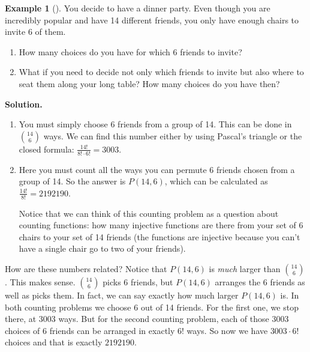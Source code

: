 \documentclass[12pt,]{book}
\theoremstyle{plain}
\theoremstyle{definition}
\theoremstyle{definition}
\newtheorem{example}[theorem]{Example}
\theoremstyle{definition}
\numberwithin{equation}{chapter}
\begin{document}
\begin{example}[]\label{example-46}
\hypertarget{p-951}{}%
You decide to have a dinner party. Even though you are incredibly popular and have 14 different friends, you only have enough chairs to invite 6 of them.%
\par
\hypertarget{p-952}{}%
\leavevmode%
\begin{enumerate}
\item\hypertarget{li-438}{}\hypertarget{p-953}{}%
How many choices do you have for which 6 friends to invite?%
\item\hypertarget{li-439}{}\hypertarget{p-954}{}%
What if you need to decide not only which friends to invite but also where to seat them along your long table?  How many choices do you have then?%
\end{enumerate}
%
\par\smallskip%
\noindent\textbf{Solution.}\hypertarget{solution-106}{}\quad%
\hypertarget{p-955}{}%
\leavevmode%
\begin{enumerate}
\item\hypertarget{li-440}{}\hypertarget{p-956}{}%
You must simply choose 6 friends from a group of 14.  This can be done in \({14 \choose 6}\) ways.  We can find this number either by using Pascal's triangle or the closed formula: \(\frac{14!}{8!\cdot 6!} = 3003\).%
\item\hypertarget{li-441}{}\hypertarget{p-957}{}%
Here you must count all the ways you can permute 6 friends chosen from a group of 14.  So the answer is \(P(14, 6)\), which can be calculated as \(\frac{14!}{8!} = 2192190\).%
\par
\hypertarget{p-958}{}%
Notice that we can think of this counting problem as a question about counting functions: how many injective functions are there from your set of 6 chairs to your set of 14 friends (the functions are injective because you can't have a single chair go to two of your friends).%
\end{enumerate}
%
\par
\hypertarget{p-959}{}%
How are these numbers related? Notice that \(P(14,6)\) is \emph{much} larger than \({14 \choose 6}\). This makes sense. \({14 \choose 6}\) picks 6 friends, but \(P(14,6)\) arranges the 6 friends as well as picks them. In fact, we can say exactly how much larger \(P(14,6)\) is. In both counting problems we choose 6 out of 14 friends. For the first one, we stop there, at 3003 ways. But for the second counting problem, each of those 3003 choices of 6 friends can be arranged in exactly \(6!\) ways. So now we have \(3003\cdot 6!\) choices and that is exactly \(2192190\).%

\end{example}
\end{document}
